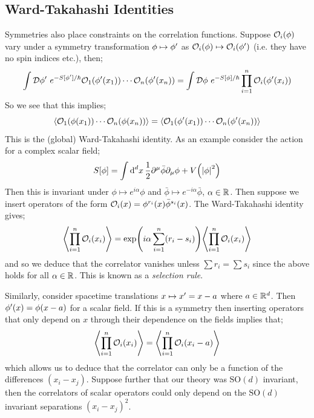 \subsection{Ward-Takahashi Identities}
Symmetries also place constraints on the correlation functions. Suppose $\mathcal{O}_i(\phi)$ vary under a symmetry transformation $\phi \mapsto \phi^{\prime}$ as $\mathcal{O}_i(\phi) \mapsto \mathcal{O}_i(\phi^{\prime})$ (i.e. they have no spin indices etc.), then;
\begin{equation*}
\int{\mD \phi\pr\,\,e^{-S[\phi\pr]/\hbar}\mO_1\left(\phi\pr(x_1)\right)\cdots\mO_n\left(\phi\pr(x_n)\right)} = \int{\mD \phi\,\,e^{-S[\phi]/\hbar}\prod_{i = 1}^{n}{\mO_i\left(\phi\pr(x_i)\right)}}
\end{equation*}
So we see that this implies;
\begin{equation}
\left< \mO_1\left(\phi(x_1)\right)\cdots\mO_n\left(\phi(x_n)\right) \right> = \left< \mO_1\left(\phi\pr(x_1)\right) \cdots \mO_n\left(\phi\pr(x_n)\right)\right>
\end{equation}
This is the (global) Ward-Takahashi identity. As an example consider the action for a complex scalar field;
\begin{equation*}
S[\phi] = \int{\upd{^d x}\frac{1}{2}\del^{\mu} \bar{\phi}\del_\mu\phi + V\left(\abs{\phi}^2\right)}
\end{equation*}
Then this is invariant under $\phi \mapsto e^{i\alpha}\phi$ and $\bar{\phi} \mapsto e^{-i\alpha}\bar{\phi}$, $\alpha \in \mathbb{R}$. Then suppose we insert operators of the form $\mathcal{O}_i(x) = \phi^{r_i}(x)\bar{\phi}^{s_i}(x)$. The Ward-Takahashi identity gives;
\begin{equation*}
\left< \prod_{i = 1}^{n}{\mO_i(x_i)} \right> = \exp\left(i\alpha \sum_{i = 1}^{n}(r_i - s_i)\right)\left< \prod_{i = 1}^{n}{\mO_i(x_i)} \right>
\end{equation*}
and so we deduce that the correlator vanishes unless $\sum{r_i} = \sum{s_i}$ since the above holds for all $\alpha \in \mathbb{R}$. This is known as a \emph{selection rule}.

\paraskip
Similarly, consider spacetime translations $x \mapsto x^{\prime} = x - a$ where $a \in \mathbb{R}^{d}$. Then $\phi^{\prime}(x) = \phi(x - a)$ for a scalar field. If this is a symmetry then inserting operators that only depend on $x$ through their dependence on the fields implies that;
\begin{equation*}
\left< \prod_{i = 1}^{n}{\mO_i(x_i)} \right> = \left< \prod_{i = 1}^{n}{\mO_{i}(x_i - a)} \right>
\end{equation*}
which allows us to deduce that the correlator can only be a function of the differences $\left(x_i - x_j\right)$. Suppose further that our theory was $\text{SO}(d)$ invariant, then the correlators of scalar operators could only depend on the $\text{SO}(d)$ invariant separations $(x_i - x_j)^2$.
